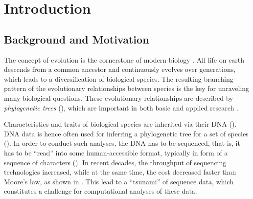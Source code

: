 
\chapter{Introduction}
\label{ch:Introduction}


\section{Background and Motivation}
\label{ch:Introduction:sec:Motivation}

The concept of evolution is the cornerstone of modern biology \cite{Dobzhansky1973}.
All life on earth descends from a common ancestor and continuously evolves over generations,
which leads to a diversification of biological species.
The resulting branching pattern of the evolutionary relationships between species
is the key for unraveling many biological questions.
These evolutionary relationships are described by \emph{phylogenetic trees}
(),
which are important in both basic \cite{Misof2014,Jarvis2014,Zanne2014} and
applied research \cite{Futuyma1995,Hendry2011,Schwartz2017}.

Characteristics and traits of biological species are inherited via their DNA
().
DNA data is hence often used for inferring a phylogenetic tree for a set of species
().
In order to conduct such analyses, the DNA has to be sequenced,
that is, it has to be ``read'' into some human-accessible format,
typically in form of a sequence of characters
().
In recent decades, the throughput of sequencing technologies increased,
while at the same time, the cost decreased faster than Moore's law,
as shown in .
This lead to a ``tsunami'' of sequence data,
which constitutes a challenge for computational analyses of these data.

